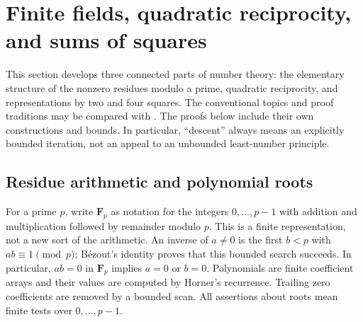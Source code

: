 \section{Finite fields, quadratic reciprocity, and sums of squares}
\label{sec:quadratic}

This section develops three connected parts of number theory: the elementary
structure of the nonzero residues modulo a prime, quadratic reciprocity, and
representations by two and four squares.  The conventional topics and proof
traditions may be compared with \cite{lynn-qr,kumar-qr,conrad-descent}.
The proofs below include their own constructions and bounds.  In particular,
``descent'' always means an explicitly bounded iteration, not an appeal to an
unbounded least-number principle.

\subsection{Residue arithmetic and polynomial roots}

For a prime $p$, write $\mathbf F_p$ as notation for the integers
$0,\ldots,p-1$ with addition and multiplication followed by remainder modulo
$p$. This is a finite representation, not a new sort of the arithmetic.
An inverse of $a\ne0$ is the first $b<p$ with $ab\equiv1\pmod p$;
B\'ezout's identity proves that this bounded search succeeds.  In particular,
$ab=0$ in $\mathbf F_p$ implies $a=0$ or $b=0$.  Polynomials are finite
coefficient arrays and their values are computed by Horner's recurrence.
Trailing zero coefficients are removed by a bounded scan.  All assertions
about roots mean finite tests over $0,\ldots,p-1$.

